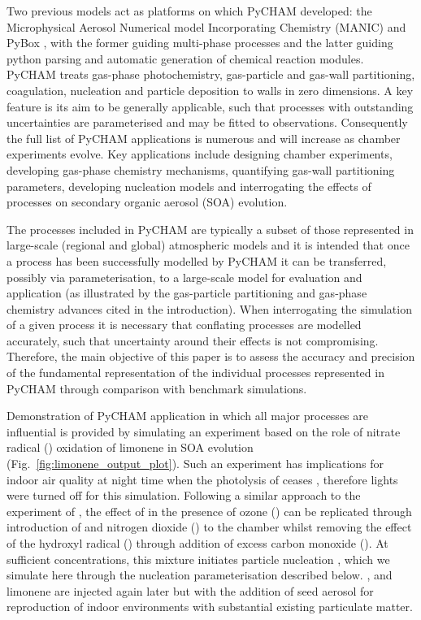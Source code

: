 \documentclass[gmd, manuscript]{copernicus}
\begin{document}
Two previous models act as platforms on which PyCHAM developed: the Microphysical Aerosol Numerical model Incorporating Chemistry (MANIC) \citep{Lowe2009} and PyBox \citep{Topping2018}, with the former guiding multi-phase processes and the latter guiding python parsing and automatic generation of chemical reaction modules.  PyCHAM treats gas-phase photochemistry, gas-particle and gas-wall partitioning, coagulation, nucleation and particle deposition to walls in zero dimensions.  A key feature is its aim to be generally applicable, such that processes with outstanding uncertainties are parameterised and may be fitted to observations.  Consequently the full list of PyCHAM applications is numerous and will increase as chamber experiments evolve.  Key applications include designing chamber experiments, developing gas-phase chemistry mechanisms, quantifying gas-wall partitioning parameters, developing nucleation models and interrogating the effects of processes on secondary organic aerosol (SOA) evolution.

The processes included in PyCHAM are typically a subset of those represented in large-scale (regional and global) atmospheric models and it is intended that once a process has been successfully modelled by PyCHAM it can be transferred, possibly via parameterisation, to a large-scale model for evaluation and application (as illustrated by the gas-particle partitioning and gas-phase chemistry advances cited in the introduction).  When interrogating the simulation of a given process it is necessary that conflating processes are modelled accurately, such that uncertainty around their effects is not compromising.  Therefore, the main objective of this paper is to assess the accuracy and precision of the fundamental representation of the individual processes represented in PyCHAM through comparison with benchmark simulations.

Demonstration of PyCHAM application in which all major processes are influential is provided by simulating an experiment based on the role of nitrate radical () oxidation of limonene in SOA evolution (Fig.~\ref{fig:limonene_output_plot}).  Such an experiment has implications for indoor air quality at night time when the photolysis of  ceases \citep{Waring2015}, therefore lights were turned off for this simulation.  Following a similar approach to the experiment of \citet{Fry2011}, the effect of  in the presence of ozone () can be replicated through introduction of  and nitrogen dioxide () to the chamber whilst removing the effect of the hydroxyl radical () through addition of excess carbon monoxide ().  At sufficient concentrations, this mixture initiates particle nucleation \citep{Fry2011}, which we simulate here through the nucleation parameterisation described below.  ,  and limonene are injected again later but with the addition of seed aerosol for reproduction of indoor environments with substantial existing particulate matter.
\end{document}
